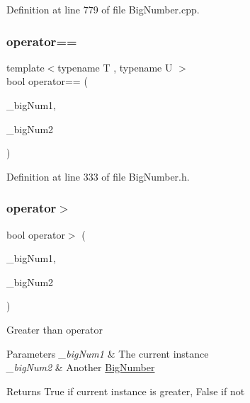 Definition at line 779 of file Big\+Number.\+cpp.

\mbox{\label{class_big_nums_1_1_big_number_add1b48504a6361ebffcef3c2b9fb5958}} 
\subsubsection{\texorpdfstring{operator==}{operator==}\hspace{0.1cm}{\footnotesize\ttfamily [2/2]}}
{\footnotesize\ttfamily template$<$typename T , typename U $>$ \\
bool operator== (\begin{DoxyParamCaption}\item[{const T \&}]{\+\_\+big\+Num1,  }\item[{const U \&}]{\+\_\+big\+Num2 }\end{DoxyParamCaption})\hspace{0.3cm}{\ttfamily [friend]}}



Definition at line 333 of file Big\+Number.\+h.

\mbox{\label{class_big_nums_1_1_big_number_a73fd242189f8c8439d4f001681d1ae51}} 
\subsubsection{\texorpdfstring{operator$>$}{operator>}}
{\footnotesize\ttfamily bool operator$>$ (\begin{DoxyParamCaption}\item[{const \mbox{\hyperlink{class_big_nums_1_1_big_number}{Big\+Number}} \&}]{\+\_\+big\+Num1,  }\item[{const \mbox{\hyperlink{class_big_nums_1_1_big_number}{Big\+Number}} \&}]{\+\_\+big\+Num2 }\end{DoxyParamCaption})\hspace{0.3cm}{\ttfamily [friend]}}

Greater than operator 
\begin{DoxyParams}{Parameters}
{\em \+\_\+big\+Num1} & The current instance \\
\hline
{\em \+\_\+big\+Num2} & Another \mbox{\hyperlink{class_big_nums_1_1_big_number}{Big\+Number}} \\
\hline
\end{DoxyParams}
\begin{DoxyReturn}{Returns}
True if current instance is greater, False if not 
\end{DoxyReturn}
\mbox{\label{class_big_nums_1_1_big_number_aa64caabb2b7a6a9bc6fc28e1abf961e3}} 
